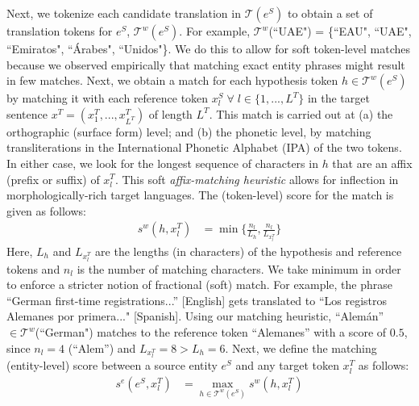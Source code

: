 \documentclass[11pt,a4paper]{article}
\begin{document}
Next, we tokenize each candidate translation in $\mathcal{T}(e^S)$ 
to obtain a set of translation tokens for $e^S$, $\mathcal{T}^{w}(e^S)$. 
For example, $\mathcal{T}^{w}$(``UAE") = \{``EAU", ``UAE", ``Emiratos", ``\'Arabes", ``Unidos"\}. 
We do this to allow for soft token-level matches 
because we observed empirically 
that matching exact entity phrases might result in few matches.
Next, we obtain a match for each hypothesis token $h \in \mathcal{T}^{w}(e^S)$
by matching it with each reference token $x^S_{l} \; \forall \; l \in \{1,...,L^T\}$ 
in the target sentence $x^T = (x^T_{1},...,x^T_{L^T})$ of length $L^T$.
This match is carried out at
(a) the orthographic (surface form) level; 
and (b) the phonetic level, 
by matching transliterations in the International Phonetic Alphabet (IPA) of the two tokens. 
In either case, we look for the longest sequence of characters in $h$
that are an affix (prefix or suffix) of $x^T_{l}$. 
This soft \emph{affix-matching heuristic} allows 
for inflection in morphologically-rich target languages. 
The (token-level) score for the match is given as follows:
\begin{align*}
    s^{w}(h, x^T_{l}) &= \min \Big\{\frac{n_{l}}{L_{h}}, \frac{n_{l}}{L_{x^T_{l}}}\Big\}
\end{align*}
Here, $L_{h}$ and $L_{x^T_{l}}$ are the lengths (in characters)
of the hypothesis and reference tokens
and $n_{l}$ is the number of matching characters. 
We take minimum in order to enforce a stricter notion of fractional (soft) match. 
For example, the phrase ``German first-time registrations...'' [English]
gets translated to ``Los registros Alemanes por primera..." [Spanish]. 
Using our matching heuristic, ``Alem\'an'' $\in \mathcal{T}^{w}$(``German") 
matches to the reference token ``Alemanes'' with a score of $0.5$, 
since $n_{l} = 4$ (``Alem'') and $L_{x^T_{l}} = 8 > L_{h} = 6$.
Next, we define the matching (entity-level) score between a source entity $e^S$ 
and any target token $x^T_{l}$ as follows:
\begin{align*}
s^{e}(e^S, x^T_{l}) &= \max_{h \in \mathcal{T}^{w}(e^S)} s^{w}(h, x^T_{l})
\end{align*}
\end{document}
